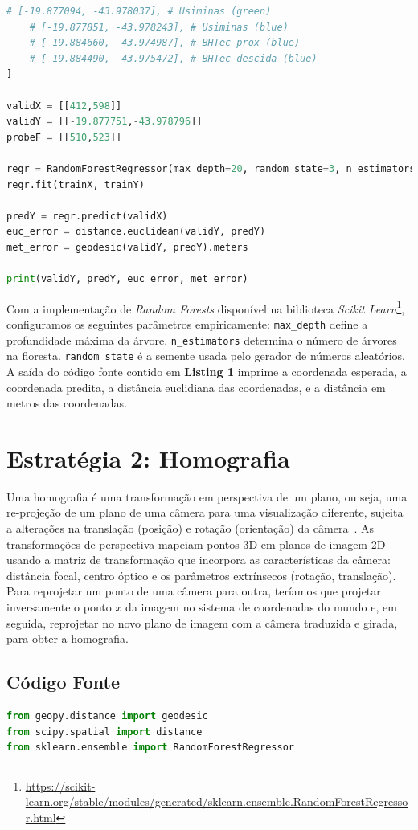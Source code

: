 \documentclass[12pt]{report}
\begin{document}
{\begin{lstlisting}[language=Python, caption=Código-fonte com Random Forests implementado para a obtenção de valores aproximados para as coordenadas.]
    # [-19.877094, -43.978037], # Usiminas (green)
    # [-19.877851, -43.978243], # Usiminas (blue)
    # [-19.884660, -43.974987], # BHTec prox (blue)
    # [-19.884490, -43.975472], # BHTec descida (blue)
]

validX = [[412,598]]
validY = [[-19.877751,-43.978796]]
probeF = [[510,523]]

regr = RandomForestRegressor(max_depth=20, random_state=3, n_estimators=200)
regr.fit(trainX, trainY)

predY = regr.predict(validX)
euc_error = distance.euclidean(validY, predY)
met_error = geodesic(validY, predY).meters

print(validY, predY, euc_error, met_error)
\end{lstlisting}

Com a implementação de \textit{Random Forests} disponível na biblioteca \textit{Scikit Learn}\footnote{\url{https://scikit-learn.org/stable/modules/generated/sklearn.ensemble.RandomForestRegressor.html}}, configuramos os seguintes parâmetros empiricamente:
\texttt{max\_depth} define a profundidade máxima da árvore. 
\texttt{n\_estimators} determina o número de árvores na floresta.
\texttt{random\_state} é a semente usada pelo gerador de números aleatórios.
A saída do código fonte contido em \textbf{Listing 1} imprime a coordenada esperada, a coordenada predita, a distância euclidiana das coordenadas, e a distância em metros das coordenadas.


\section*{Estratégia 2: Homografia}
Uma homografia é uma transformação em perspectiva de um plano, ou seja, uma re-projeção de um plano de uma câmera para uma visualização diferente, sujeita a alterações na translação (posição) e rotação (orientação) da câmera~\cite{detone2016deep}.
As transformações de perspectiva mapeiam pontos 3D em planos de imagem 2D usando a matriz de transformação que incorpora as características da câmera: distância focal, centro óptico e os parâmetros extrínsecos (rotação, translação).
Para reprojetar um ponto de uma câmera para outra, teríamos que projetar inversamente o ponto $x$ da imagem no sistema de coordenadas do mundo e, em seguida, reprojetar no novo plano de imagem com a câmera traduzida e girada, para obter a homografia.

\subsection*{Código Fonte}
\begin{lstlisting}[language=Python, caption=Código-fonte com Homografia implementado para a obtenção de valores aproximados para as coordenadas.]
from geopy.distance import geodesic
from scipy.spatial import distance
from sklearn.ensemble import RandomForestRegressor


\end{lstlisting}}
\end{document}
